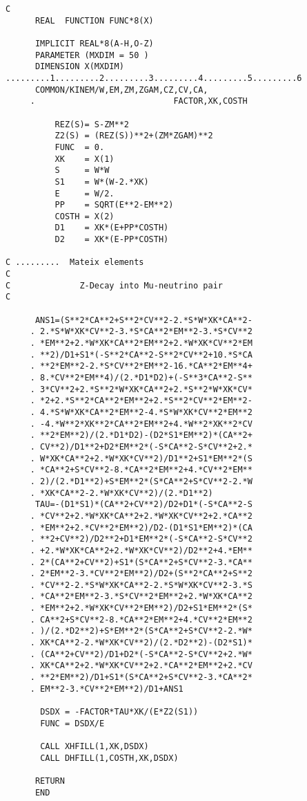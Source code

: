 \vskip 1.0cm
\par
{\scriptsize
\begin{verbatim}
C
      REAL  FUNCTION FUNC*8(X)

      IMPLICIT REAL*8(A-H,O-Z)
      PARAMETER (MXDIM = 50 )
      DIMENSION X(MXDIM)
.........1.........2.........3.........4.........5.........6
      COMMON/KINEM/W,EM,ZM,ZGAM,CZ,CV,CA,
     .                            FACTOR,XK,COSTH

          REZ(S)= S-ZM**2
          Z2(S) = (REZ(S))**2+(ZM*ZGAM)**2
          FUNC  = 0.
          XK    = X(1)
          S     = W*W
          S1    = W*(W-2.*XK)
          E     = W/2.
          PP    = SQRT(E**2-EM**2)
          COSTH = X(2)
          D1    = XK*(E+PP*COSTH)
          D2    = XK*(E-PP*COSTH)

C .........  Mateix elements 
C
C              Z-Decay into Mu-neutrino pair
C

      ANS1=(S**2*CA**2+S**2*CV**2-2.*S*W*XK*CA**2-
     . 2.*S*W*XK*CV**2-3.*S*CA**2*EM**2-3.*S*CV**2
     . *EM**2+2.*W*XK*CA**2*EM**2+2.*W*XK*CV**2*EM
     . **2)/D1+S1*(-S**2*CA**2-S**2*CV**2+10.*S*CA
     . **2*EM**2-2.*S*CV**2*EM**2-16.*CA**2*EM**4+
     . 8.*CV**2*EM**4)/(2.*D1*D2)+(-S**3*CA**2-S**
     . 3*CV**2+2.*S**2*W*XK*CA**2+2.*S**2*W*XK*CV*
     . *2+2.*S**2*CA**2*EM**2+2.*S**2*CV**2*EM**2-
     . 4.*S*W*XK*CA**2*EM**2-4.*S*W*XK*CV**2*EM**2
     . -4.*W**2*XK**2*CA**2*EM**2+4.*W**2*XK**2*CV
     . **2*EM**2)/(2.*D1*D2)-(D2*S1*EM**2)*(CA**2+
     . CV**2)/D1**2+D2*EM**2*(-S*CA**2-S*CV**2+2.*
     . W*XK*CA**2+2.*W*XK*CV**2)/D1**2+S1*EM**2*(S
     . *CA**2+S*CV**2-8.*CA**2*EM**2+4.*CV**2*EM**
     . 2)/(2.*D1**2)+S*EM**2*(S*CA**2+S*CV**2-2.*W
     . *XK*CA**2-2.*W*XK*CV**2)/(2.*D1**2)
      TAU=-(D1*S1)*(CA**2+CV**2)/D2+D1*(-S*CA**2-S
     . *CV**2+2.*W*XK*CA**2+2.*W*XK*CV**2+2.*CA**2
     . *EM**2+2.*CV**2*EM**2)/D2-(D1*S1*EM**2)*(CA
     . **2+CV**2)/D2**2+D1*EM**2*(-S*CA**2-S*CV**2
     . +2.*W*XK*CA**2+2.*W*XK*CV**2)/D2**2+4.*EM**
     . 2*(CA**2+CV**2)+S1*(S*CA**2+S*CV**2-3.*CA**
     . 2*EM**2-3.*CV**2*EM**2)/D2+(S**2*CA**2+S**2
     . *CV**2-2.*S*W*XK*CA**2-2.*S*W*XK*CV**2-3.*S
     . *CA**2*EM**2-3.*S*CV**2*EM**2+2.*W*XK*CA**2
     . *EM**2+2.*W*XK*CV**2*EM**2)/D2+S1*EM**2*(S*
     . CA**2+S*CV**2-8.*CA**2*EM**2+4.*CV**2*EM**2
     . )/(2.*D2**2)+S*EM**2*(S*CA**2+S*CV**2-2.*W*
     . XK*CA**2-2.*W*XK*CV**2)/(2.*D2**2)-(D2*S1)*
     . (CA**2+CV**2)/D1+D2*(-S*CA**2-S*CV**2+2.*W*
     . XK*CA**2+2.*W*XK*CV**2+2.*CA**2*EM**2+2.*CV
     . **2*EM**2)/D1+S1*(S*CA**2+S*CV**2-3.*CA**2*
     . EM**2-3.*CV**2*EM**2)/D1+ANS1

       DSDX = -FACTOR*TAU*XK/(E*Z2(S1))
       FUNC = DSDX/E

       CALL XHFILL(1,XK,DSDX)
       CALL DHFILL(1,COSTH,XK,DSDX)

      RETURN
      END
\end{verbatim}}